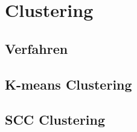 \section{Clustering}
\subsection{Verfahren}
\subsection{K-means Clustering}
\subsection{SCC Clustering}

